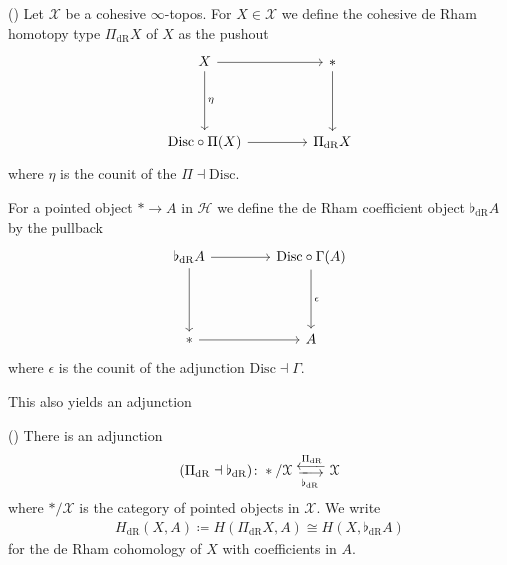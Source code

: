 \documentclass[10pt]{amsart}
\begin{document}
\begin{definition}
  \label{def:cohesive_de_rham}
  (\cite[Def. 3.9.12]{schreiber2013cohesive})
  Let $\mathcal{X}$ be a cohesive $\infty$-topos. For $X\in
  \mathcal{X}$ we define the cohesive de Rham homotopy type
  $\Pi_{\mathrm{dR}}X$ of $X$ as the pushout
  \begin{equation}
    \begin{tikzcd}[nodes in empty cells, column sep= 1.5cm, row sep=1.5cm]
      X
      \ar[r]
      \ar[d,"\eta"]
      &
      \ast
      \ar[d]
      \\
      \mathrm{Disc}\circ \Pi (X)
      \ar[r]
      &
      \Pi_{\mathrm{dR}}X
    \end{tikzcd}
  \end{equation}
  where $\eta$ is the counit of the $\Pi \dashv \mathrm{Disc}$.

  For a pointed object $\ast \rightarrow A$ in $\mathcal{H}$ we define
  the de Rham coefficient object $\flat_{\mathrm{dR}}A$ by the pullback
  \begin{equation}
    \begin{tikzcd}[nodes in empty cells, column sep= 1.5cm, row sep=1.5cm]
      \flat_{\mathrm{dR}}A
      \ar[r]
      \ar[d]
      &
      \mathrm{Disc} \circ \Gamma (A)
      \ar[d, "\epsilon"]
      \\
      \ast
      \ar[r]
      &
      A
    \end{tikzcd}
  \end{equation}
  where $\epsilon$ is the counit of the adjunction
  $\mathrm{Disc}\dashv \Gamma$.
\end{definition}

This also yields an adjunction
\begin{proposition}
  (\cite[Prop. 3.9.13, Def 3.9.15]{schreiber2013cohesive})
  There is an adjunction
  \begin{align*}
    (\Pi_{\mathrm{dR}} \dashv \flat_{\mathrm{dR}}) \colon
    \ast/\mathcal{X}
    \mathrel{\substack{
    \textstyle\xlongleftarrow{\Pi_{\mathrm{dR}}} \\[-0.2ex]
    \textstyle\xlongrightarrow[\flat_{\mathrm{dR}}]{}}
    }
    \mathcal{X}
  \end{align*}
  where $\ast/\mathcal{X}$ is the category of pointed objects in $\mathcal{X}$.
  We write
  \begin{align*}
    H_{\mathrm{dR}}(X,A) \coloneqq H(\Pi_{\mathrm{dR}}X,A) \cong H(X,\flat_{\mathrm{dR}}A)
  \end{align*}
  for the de Rham cohomology of $X$ with coefficients in $A$.
\end{proposition}
\end{document}
